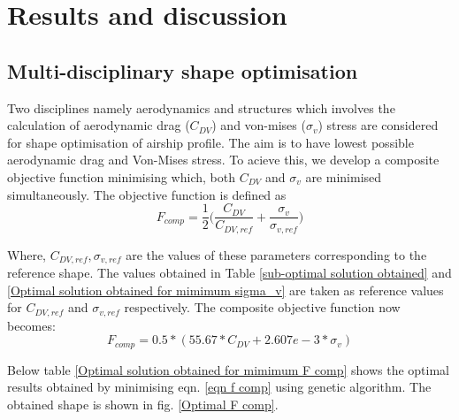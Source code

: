 \chapter{Results and discussion}
\label{Final results}

\section{Multi-disciplinary shape optimisation}
Two disciplines namely aerodynamics and structures which involves the calculation of aerodynamic drag ($ C_{DV} $) and von-mises ($ \sigma _{v} $) stress are considered for shape optimisation of airship profile. The aim is to have lowest possible aerodynamic drag and Von-Mises stress. To acieve this, we develop a composite objective function minimising which, both $ C_{DV} $ and $ \sigma _{v} $ are minimised simultaneously.
The objective function is defined as
\begin{equation}
F_{comp} = \frac{1}{2}\bigg( \frac{C_{DV}}{C_{DV,ref}} + \dfrac{\sigma _{v}}{\sigma _{v,ref}} \bigg)
\end{equation}

Where, $C_{DV,ref} , \sigma _{v,ref}  $ are the values of these parameters corresponding to the reference shape.  The values obtained in Table \ref{sub-optimal solution obtained} and \ref{Optimal solution obtained for mimimum sigma_v} are taken as reference values for $C_{DV,ref}$ and $\sigma _{v,ref}  $ respectively. The composite objective function now becomes:
\begin{equation}
\label{eqn f comp}
F_{comp} = 0.5*(55.67* C_{DV} + 2.607e-3 * \sigma _{v})
\end{equation}

Below table \ref{Optimal solution obtained for mimimum F comp} shows the optimal results obtained by minimising eqn. \ref{eqn f comp} using genetic algorithm. The obtained shape is shown in fig. \ref{Optimal F comp}. 

